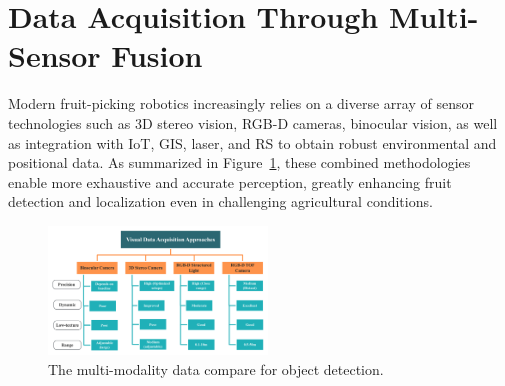 \documentclass[a4paper,fleqn]{cas-dc}
\begin{document}
\section{Data Acquisition Through Multi-Sensor Fusion}
Modern fruit-picking robotics increasingly relies on a diverse array of sensor technologies such as 3D stereo vision, RGB-D cameras, binocular vision, as well as integration with IoT, GIS, laser, and RS to obtain robust environmental and positional data. As summarized in %
Figure~\ref{fig:camera}, these combined methodologies enable more exhaustive and accurate perception, greatly enhancing fruit detection and localization even in challenging agricultural conditions.
\begin{figure}[hbtp]
\centering
\includegraphics[width=0.52\textwidth]{fig_camera1.png}
\caption{The multi-modality data compare for object detection.}
\label{fig:camera}
\end{figure}
\end{document}
